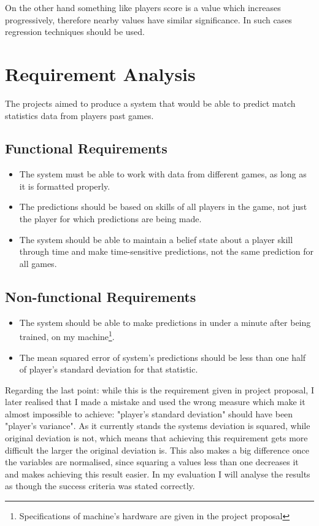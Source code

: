 \documentclass[12pt,a4paper]{book}
\begin{document}
On the other hand something like players score is a value which increases progressively, therefore nearby values have similar significance.
In such cases regression techniques should be used.
\section{Requirement Analysis}
The projects aimed to produce a system that would be able to predict match statistics data from players past games.
\subsection{Functional Requirements}
\begin{itemize}
\item The system must be able to work with data from different games, as long as it is formatted properly.
\item The predictions should be based on skills of all players in the game, not just the player for which predictions are being made.
\item The system should be able to maintain a belief state about a player skill through time and make time-sensitive predictions, not the same prediction for all games. %
\end{itemize}
\subsection{Non-functional Requirements}
\begin{itemize}
\item The system should be able to make predictions in under a minute after being trained, on my machine\footnote{Specifications of machine's hardware are given in the project proposal}.
\item The mean squared error of system's predictions should be less than one half of player's standard deviation for that statistic.
\end{itemize}
\label{requirements-error}
Regarding the last point: while this is the requirement given in project proposal, I later realised that I made a mistake and used the wrong measure which make it almost impossible to achieve:
"player's standard deviation" should have been "player's variance".
As it currently stands the systems deviation is squared, while original deviation is not, which means that achieving this requirement gets more difficult the larger the original deviation is.
This also makes a big difference once the variables are normalised, since squaring a values less than one decreases it and makes achieving this result easier.
In my evaluation I will analyse the results as though the success criteria was stated correctly.
\end{document}
